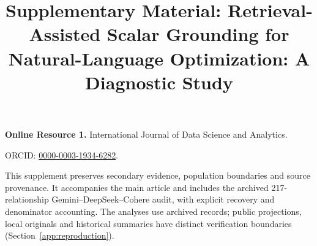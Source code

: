 \documentclass[pdflatex,sn-basic,Numbered]{sn-jnl}
\begin{document}
\title[Supplement: Scalar Grounding]{Supplementary Material: Retrieval-Assisted Scalar Grounding for Natural-Language Optimization: A Diagnostic Study}
\author*[1]{ }
\maketitle
\renewcommand{\thesection}{S\arabic{section}}
\renewcommand{\thetable}{S\arabic{table}}
\renewcommand{\thefigure}{S\arabic{figure}}
\renewcommand{\theequation}{S\arabic{equation}}
\noindent\textbf{Online Resource 1.} International Journal of Data Science and Analytics.\par
\noindent ORCID: \href{https://orcid.org/0000-0003-1934-6282}{0000-0003-1934-6282}.\par

This supplement preserves secondary evidence, population boundaries and source provenance. It accompanies the main article and includes the archived 217-relationship Gemini--DeepSeek--Cohere audit, with explicit recovery and denominator accounting. The analyses use archived records; public projections, local originals and historical summaries have distinct verification boundaries (Section~\ref{app:reproduction}).
\end{document}
